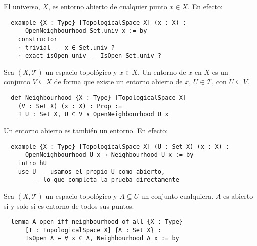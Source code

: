 \begin{example}
  El universo, $X$, es entorno abierto de cualquier punto $x \in X$. En efecto:
\end{example}

\begin{lstlisting}
  example {X : Type} [TopologicalSpace X] (x : X) :
      OpenNeighbourhood Set.univ x := by
    constructor
    · trivial -- x ∈ Set.univ ?
    · exact isOpen_univ -- IsOpen Set.univ ? \end{lstlisting}

\begin{definition}
  Sea $(X, \mathcal{T})$ un espacio topológico y $x \in X$. Un \textnormal{entorno} de $x$ en $X$ es un conjunto $V \subseteq X$ de forma que existe un entorno abierto de $x$, $U \in \mathcal{T}$, con $U \subseteq V$.
\end{definition}

\begin{lstlisting}
  def Neighbourhood {X : Type} [TopologicalSpace X]
    (V : Set X) (x : X) : Prop :=
    ∃ U : Set X, U ⊆ V ∧ OpenNeighbourhood U x
\end{lstlisting}

\begin{example}
  Un entorno abierto es también un entorno. En efecto:
\end{example}

\begin{lstlisting}
  example {X : Type} [TopologicalSpace X] (U : Set X) (x : X) :
      OpenNeighbourhood U x → Neighbourhood U x := by
    intro hU
    use U -- usamos el propio U como abierto,
        -- lo que completa la prueba directamente
\end{lstlisting}

\begin{proposition}\label{caracterizacion-abierto}
  Sea $(X, \mathcal{T})$ un espacio topológico y $A \subseteq U$ un conjunto cualquiera. $A$ es abierto si y solo si es entorno de todos sus puntos.
\end{proposition}

\begin{lstlisting}
  lemma A_open_iff_neighbourhood_of_all {X : Type}
      [T : TopologicalSpace X] {A : Set X} :
      IsOpen A ↔ ∀ x ∈ A, Neighbourhood A x := by
\end{lstlisting}

